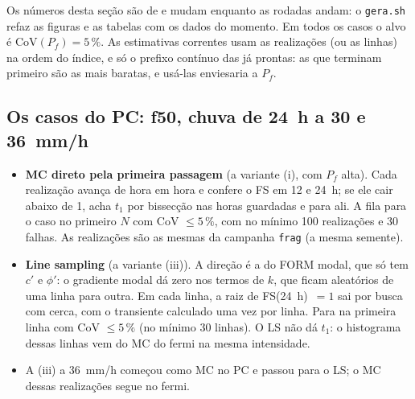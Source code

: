 \documentclass[11pt,a4paper]{article}
\newcommand{\Pf}{P_f}
\begin{document}
Os números desta seção são de \mcData{} e mudam enquanto as rodadas andam: o \texttt{gera.sh} refaz as figuras e as
tabelas com os dados do momento. Em todos os casos o alvo é CoV$(\Pf) = 5\,\%$. As estimativas correntes usam as
realizações (ou as linhas) na ordem do índice, e só o prefixo contínuo das já prontas: as que terminam primeiro são as
mais baratas, e usá-las enviesaria a $\Pf$.

\subsection{Os casos do PC: f50, chuva de 24~h a 30 e 36~mm/h}\label{sec:mcpc}
\begin{itemize}
  \item \textbf{MC direto pela primeira passagem} (a variante (i), com $\Pf$ alta). Cada realização avança de hora em
    hora e confere o FS em 12 e 24~h; se ele cair abaixo de 1, acha $t_1$ por bissecção nas horas guardadas e para ali.
    A fila para o caso no primeiro $N$ com CoV $\le 5\,\%$, com no mínimo 100 realizações e 30 falhas. As realizações
    são as mesmas da campanha \texttt{frag} (a mesma semente).
  \item \textbf{Line sampling} (a variante (iii)). A direção é a do FORM modal, que só tem $c'$ e $\phi'$: o gradiente
    modal dá zero nos termos de $k$, que ficam aleatórios de uma linha para outra. Em cada linha, a raiz de
    FS(24~h)~$= 1$ sai por busca com cerca, com o transiente calculado uma vez por linha. Para na primeira linha com
    CoV $\le 5\,\%$ (no mínimo 30 linhas). O LS não dá $t_1$: o histograma dessas linhas vem do MC do fermi na mesma
    intensidade.
  \item A (iii) a 36~mm/h começou como MC no PC e passou para o LS; o MC dessas realizações segue no fermi.
\end{itemize}

\begin{table}[H]\centering\small
\caption{Os casos do PC (\texttt{\textasciitilde/projects/runs/pc\_f50\_ls\_mc}) e, nas linhas sem rótulo, o MC das mesmas condições.
Fórmula: $\Phi(-\ln(m'F)/\beta)$, com o $F$ do $k_s$ mediano e o $m'$ e o $\beta$ da calibração da variante. CoV do MC:
$\sqrt{(1-\Pf)/(N\Pf)}$; do LS: o desvio padrão das $p_i$ das linhas dividido por $\sqrt N\,\Pf$. ``min/$N$'':
minutos de CPU por realização ou por linha. $t_1$: a mediana e, entre colchetes, os quantis de 10 e 90\,\% das
falhas. O FORM está no texto.}\label{tab:mcpc}
\resizebox{\textwidth}{!}{}
\end{table}
\end{document}
